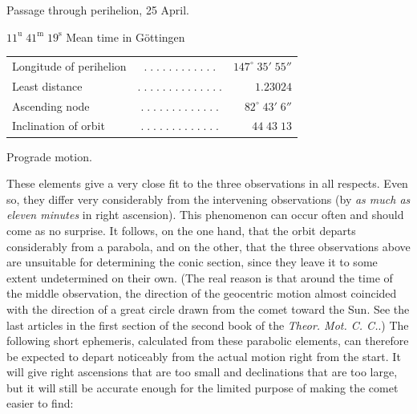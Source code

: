 \begin{center}\fontsize{10}{12}\selectfont Passage through perihelion, 25 April.\par $11^{\mathrm u}\;41^{\mathrm m}\;19^{\mathrm s}$ Mean time in Göttingen\end{center}
\begin{center}\fontsize{10}{12}\selectfont\setlength{\tabcolsep}{3pt}\renewcommand{\arraystretch}{1.15}\begin{tabular}{lcr}
Longitude of perihelion & $.\;.\;.\;.\;.\;.\;.\;.\;.\;.\;.\;.$ & $147^\circ\;35'\;55''$\\
Least distance & $.\;.\;.\;.\;.\;.\;.\;.\;.\;.\;.\;.\;.\;.$ & $1.23024$\\
Ascending node & $.\;.\;.\;.\;.\;.\;.\;.\;.\;.\;.\;.\;.$ & $82^\circ\;43'\;6''$\\
Inclination of orbit & $.\;.\;.\;.\;.\;.\;.\;.\;.\;.\;.\;.\;.$ & $44\;43\;13$\\
\end{tabular}\end{center}\begin{center}Prograde motion.\end{center}

\par\indent These elements give a very close fit to the three observations in all respects. Even so, they differ very considerably from the intervening observations (by \emph{as much as eleven minutes} in right ascension). This phenomenon can occur often and should come as no surprise. It follows, on the one hand, that the orbit departs considerably from a parabola, and on the other, that the three observations above are unsuitable for determining the conic section, since they leave it to some extent undetermined on their own. (The real reason is that around the time of the middle observation, the direction of the geocentric motion almost coincided with the direction of a great circle drawn from the comet toward the Sun. See the last articles in the first section of the second book of the \emph{Theor. Mot. C. C.}.) The following short ephemeris, calculated from these parabolic elements, can therefore be expected to depart noticeably from the actual motion right from the start. It will give right ascensions that are too small and declinations that are too large, but it will still be accurate enough for the limited purpose of making the comet easier to find:

